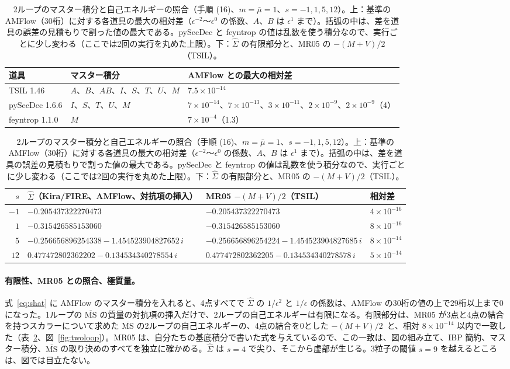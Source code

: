 \documentclass[a4paper,10pt]{ltjsarticle}
\begin{document}
\begin{table}[tbp]
\centering\small
\caption{2ループのマスター積分と自己エネルギーの照合（手順 (16)、$m=\bar\mu=1$、$s=-1,1,5,12$）。上：基準の AMFlow（30桁）に対する各道具の最大の相対差（$\epsilon^{-2}$〜$\epsilon^0$ の係数、$A$、$B$ は $\epsilon^1$ まで）。括弧の中は、差を道具の誤差の見積もりで割った値の最大である。pySecDec と feyntrop の値は乱数を使う積分なので、実行ごとに少し変わる（ここでは2回の実行を丸めた上限）。下：$\hat\Sigma$ の有限部分と、MR05 の $-(M+V)/2$（TSIL）。}
\label{tab:twoloop}
\begin{tabular}{lll}
\toprule
道具 & マスター積分 & AMFlow との最大の相対差 \\
\midrule
TSIL 1.46 & $A$、$B$、$AB$、$I$、$S$、$T$、$U$、$M$ & $7.5\times10^{-14}$ \\
pySecDec 1.6.6 & $I$、$S$、$T$、$U$、$M$ & $7\times10^{-14}$、$7\times10^{-13}$、$3\times10^{-11}$、$2\times10^{-9}$、$2\times10^{-9}$（4） \\
feyntrop 1.1.0 & $M$ & $7\times10^{-4}$（1.3） \\
\bottomrule
\end{tabular}

\vspace{2mm}
\begin{tabular}{rlll}
\toprule
$s$ & $\hat\Sigma$（Kira/FIRE、AMFlow、対抗項の挿入） & MR05 $-(M+V)/2$（TSIL） & 相対差 \\
\midrule
$-1$ & $-0.205437322270473$ & $-0.205437322270473$ & $4\times10^{-16}$ \\
$1$ & $-0.315426585153060$ & $-0.315426585153060$ & $8\times10^{-16}$ \\
$5$ & $-0.256656896254338-1.454523904827652\,i$ & $-0.256656896254224-1.454523904827685\,i$ & $8\times10^{-14}$ \\
$12$ & $0.477472802362202-0.134534340278554\,i$ & $0.477472802362205-0.134534340278578\,i$ & $5\times10^{-14}$ \\
\bottomrule
\end{tabular}
\end{table}

\paragraph{有限性、MR05 との照合、極質量。}式~\eqref{eq:shat} に AMFlow のマスター積分を入れると、4点すべてで $\hat\Sigma$ の $1/\epsilon^2$ と $1/\epsilon$ の係数は、AMFlow の30桁の値の上で29桁以上まで0になった。1ループの $\overline{\mathrm{MS}}$ の質量の対抗項の挿入だけで、2ループの自己エネルギーは有限になる。有限部分は、MR05 が3点と4点の結合を持つスカラーについて求めた $\overline{\mathrm{MS}}$ の2ループの自己エネルギーの、4点の結合を0とした $-(M+V)/2$~\cite{tsil}と、相対 $8\times10^{-14}$ 以内で一致した（表~\ref{tab:twoloop}、図~\ref{fig:twoloop}）。MR05 は、自分たちの基底積分で書いた式を与えているので、この一致は、図の組み立て、IBP 簡約、マスター積分、$\overline{\mathrm{MS}}$ の取り決めのすべてを独立に確かめる。$\hat\Sigma$ は $s=4$ で尖り、そこから虚部が生じる。3粒子の閾値 $s=9$ を越えるところは、図では目立たない。
\end{document}
